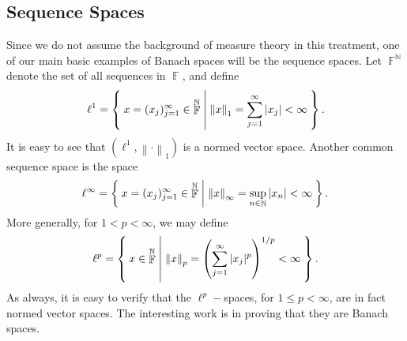 \documentclass[11pt, a4paper]{memoir}
\DeclareMathOperator{\N}{{\mathbb{N}}}
\DeclareMathOperator{\F}{{\mathbb{F}}}
\newcommand{\norm}[1]{\ensuremath{\left\lVert#1\right\rVert}}
\theoremstyle{change}
\theoremstyle{plain}
\theoremstyle{nonumberplain}
\newcommand{\lp}[1]{\ensuremath{\ell^{#1}}}
\numberwithin{equation}{section}
\begin{document}
\subsection{Sequence Spaces}
Since we do not assume the background of measure theory in this treatment, one of our main basic examples of Banach spaces will be the sequence spaces.
Let $\F^{\N}$ denote the set of all sequences in $\F$, and define
\begin{equation*}
    \lp{1}=\Set{x=(x_j)_{j=1}^\infty\in\F^{\N} | \norm{x}_1=\sum_{j=1}^\infty|x_j|<\infty}.
\end{equation*}
It is easy to see that $(\lp{1},\norm{\cdot}_1)$ is a normed vector space.
Another common sequence space is the space
\begin{equation*}
    \lp{\infty}=\Set{x=(x_j)_{j=1}^\infty\in\F^{\N} | \norm{x}_\infty=\sup_{n\in\N}|x_n|<\infty}.
\end{equation*}
More generally, for $1<p<\infty$, we may define
\begin{equation*}
    \lp{p}=\Set{x\in\F^{\N} |\norm{x}_p=\left(\sum_{j=1}^\infty|x_j|^p\right)^{1/p}<\infty}.
\end{equation*}
As always, it is easy to verify that the $\lp{p}-$spaces, for $1\leq p<\infty$, are in fact normed vector spaces.
The interesting work is in proving that they are Banach spaces.
\end{document}
